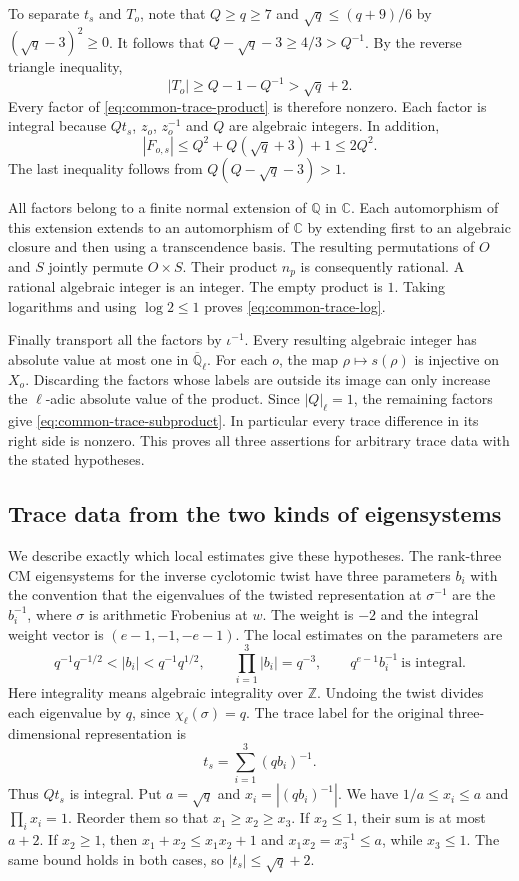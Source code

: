 To separate \(t_s\) and \(T_o\), note that \(Q\ge q\ge7\) and
\(\sqrt q\le(q+9)/6\) by \((\sqrt q-3)^2\ge0\).
It follows that \(Q-\sqrt q-3\ge4/3>Q^{-1}\). By the reverse
triangle inequality,
\[
              |T_o|\ge Q-1-Q^{-1}>\sqrt q+2 .
\]
Every factor of \eqref{eq:common-trace-product} is therefore
nonzero. Each factor is integral because \(Qt_s\), \(z_o\),
\(z_o^{-1}\) and \(Q\) are algebraic integers. In addition,
\[
 |F_{o,s}|\le Q^2+Q(\sqrt q+3)+1\le2Q^2 .
\]
The last inequality follows from \(Q(Q-\sqrt q-3)>1\).

All factors belong to a finite normal extension of \(\mathbb Q\)
in \(\mathbb C\). Each automorphism of this extension extends to an
automorphism of \(\mathbb C\) by extending first to an algebraic
closure and then using a transcendence basis. The resulting
permutations of \(O\) and \(S\) jointly permute \(O\times S\).
Their product \(n_p\) is consequently rational. A rational algebraic
integer is an integer. The empty product is \(1\). Taking logarithms
and using \(\log2\le1\) proves \eqref{eq:common-trace-log}.

Finally transport all the factors by \(\iota^{-1}\).
Every resulting algebraic integer has absolute value at most one
in \(\overline{\mathbb Q}_\ell\). For each \(o\), the map
\(\rho\mapsto s(\rho)\) is injective on \(X_o\). Discarding the
factors whose labels are outside its image can only increase
the \(\ell\)-adic absolute value of the product. Since
\(|Q|_\ell=1\), the remaining factors give
\eqref{eq:common-trace-subproduct}. In particular every trace
difference in its right side is nonzero. This proves all three
assertions for arbitrary trace data with the stated hypotheses.

\subsection{Trace data from the two kinds of eigensystems}

We describe exactly which local estimates give these hypotheses.
The rank-three CM eigensystems for the inverse cyclotomic twist
have three parameters \(b_i\) with the convention that the
eigenvalues of the twisted representation at \(\sigma^{-1}\) are
the \(b_i^{-1}\), where \(\sigma\) is arithmetic Frobenius at \(w\).
The weight is \(-2\) and the integral weight vector is
\((e-1,-1,-e-1)\). The local estimates on the parameters are
\[
     q^{-1}q^{-1/2}< |b_i| < q^{-1}q^{1/2},\qquad
     \prod_{i=1}^3 |b_i|=q^{-3},\qquad
     q^{e-1}b_i^{-1}\ \text{is integral}.
\]
Here integrality means algebraic integrality over \(\mathbb Z\).
Undoing the twist divides each eigenvalue by \(q\), since
\(\chi_\ell(\sigma)=q\). The trace label for the original
three-dimensional representation is
\[
                         t_s=\sum_{i=1}^3(qb_i)^{-1}.
\]
Thus \(Qt_s\) is integral. Put \(a=\sqrt q\) and
\(x_i=|(qb_i)^{-1}|\). We have \(1/a\le x_i\le a\) and
\(\prod_i x_i=1\). Reorder them so that \(x_1\ge x_2\ge x_3\).
If \(x_2\le1\), their sum is at most \(a+2\).
If \(x_2\ge1\), then \(x_1+x_2\le x_1x_2+1\) and
\(x_1x_2=x_3^{-1}\le a\), while \(x_3\le1\).
The same bound holds in both cases, so \(|t_s|\le\sqrt q+2\).

